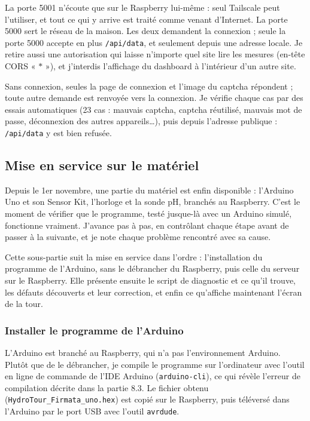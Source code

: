 La porte 5001 n'écoute que sur le Raspberry lui-même : seul Tailscale peut l'utiliser, et tout ce qui y arrive est traité comme venant d'Internet. La porte 5000 sert le réseau de la maison. Les deux demandent la connexion ; seule la porte 5000 accepte en plus \texttt{/api/data}, et seulement depuis une adresse locale. Je retire aussi une autorisation qui laisse n'importe quel site lire les mesures (en-tête CORS « $*$ »), et j'interdis l'affichage du dashboard à l'intérieur d'un autre site.

\begin{aretenir}
Sans connexion, seules la page de connexion et l'image du captcha répondent ; toute autre demande est renvoyée vers la connexion. Je vérifie chaque cas par des essais automatiques (23 cas : mauvais captcha, captcha réutilisé, mauvais mot de passe, déconnexion des autres appareils\ldots), puis depuis l'adresse publique : \texttt{/api/data} y est bien refusée.
\end{aretenir}

\subsection{Mise en service sur le matériel}

Depuis le 1er novembre, une partie du matériel est enfin disponible : l'Arduino Uno et son Sensor Kit, l'horloge et la sonde pH, branchés au Raspberry. C'est le moment de vérifier que le programme, testé jusque-là avec un Arduino simulé, fonctionne vraiment. J'avance pas à pas, en contrôlant chaque étape avant de passer à la suivante, et je note chaque problème rencontré avec sa cause.

Cette sous-partie suit la mise en service dans l'ordre : l'installation du programme de l'Arduino, sans le débrancher du Raspberry, puis celle du serveur sur le Raspberry. Elle présente ensuite le script de diagnostic et ce qu'il trouve, les défauts découverts et leur correction, et enfin ce qu'affiche maintenant l'écran de la tour.

\subsubsection*{Installer le programme de l'Arduino}

L'Arduino est branché au Raspberry, qui n'a pas l'environnement Arduino. Plutôt que de le débrancher, je compile le programme sur l'ordinateur avec l'outil en ligne de commande de l'IDE Arduino (\texttt{arduino-cli}), ce qui révèle l'erreur de compilation décrite dans la partie 8.3. Le fichier obtenu (\texttt{HydroTour\_Firmata\_uno.hex}) est copié sur le Raspberry, puis téléversé dans l'Arduino par le port USB avec l'outil \texttt{avrdude}.

